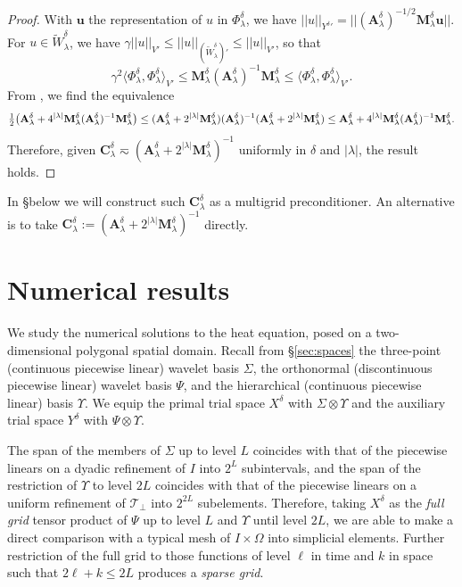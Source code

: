 \documentclass[11pt,a4paper,oneside,english]{amsart}
\numberwithin{equation}{section}
\numberwithin{theorem}{section}
\theoremstyle{definition}
\newcommand{\la}{\langle}
\newcommand{\ra}{\rangle}
\newcommand{\T}{\mathcal{T}}
\newcommand{\jw}[1]{{\color{red}{JW: #1}}}
\begin{document}
\begin{proof}

  With $\mathbf u$ the representation of $u$ in $\Phi_\lambda^\delta$, we have
  $||u||_{{Y^\delta}'} = ||(\mathbf A_\lambda^\delta)^{-1/2} \mathbf M_\lambda^\delta \mathbf u||$.
For $u \in \tilde W_\lambda^\delta$, we have $\gamma ||u||_{V'} \leq ||u||_{(\tilde W_\lambda^\delta)'} \leq ||u||_{V'}$, so that
  \[
    \gamma^2 \la \Phi_\lambda^\delta, \Phi_\lambda^\delta \ra_{V'} \leq \mathbf M_\lambda^\delta (\mathbf A_\lambda^\delta)^{-1} \mathbf M_\lambda^\delta \leq \la \Phi_\lambda^\delta, \Phi_\lambda^\delta \ra_{V'}.
  \]
  From \cite[Thm.~4]{Pearson2012}, we find the equivalence
  \[
\tfrac12\big( {\bf A}_\lambda^\delta + 4^{|\lambda|} {\bf M}^\delta_\lambda ({\bf A}^\delta_\lambda)^{-1}  {\bf M}^\delta_\lambda\big)
\leq ({\bf A}_\lambda^\delta + 2^{|\lambda|}{\bf M}^\delta_\lambda) ({\bf A}_\lambda^\delta)^{-1} ({\bf A}_\lambda^\delta + 2^{|\lambda|}{\bf M}^\delta_\lambda)
\leq {\bf A}_\lambda^\delta + 4^{|\lambda|} {\bf M}^\delta_\lambda ({\bf A}^\delta_\lambda)^{-1}  {\bf M}^\delta_\lambda.
\]
Therefore, given $\mathbf C_\lambda^\delta \eqsim (\mathbf A_\lambda^\delta + 2^{|\lambda|} \mathbf M_\lambda^\delta)^{-1}$ uniformly in $\delta$ and $|\lambda|$, the result holds.
\end{proof}
In \S below we will construct such $\mathbf C_\lambda^\delta$ as a multigrid preconditioner. An alternative is to take $\mathbf C_\lambda^\delta := (\mathbf A_\lambda^\delta + 2^{|\lambda|} \mathbf M_\lambda^\delta)^{-1}$ directly.




\section{Numerical results}
We study the numerical solutions to the heat equation, posed on a two-dimensional
polygonal spatial domain. Recall from \S\ref{sec:spaces} the three-point (continuous piecewise linear) 
wavelet basis $\Sigma$, the orthonormal (discontinuous piecewise linear)
wavelet basis $\Psi$, and the hierarchical (continuous piecewise linear) basis $\Upsilon$.
We equip the primal trial space $X^\delta$ with
$\Sigma \otimes \Upsilon$ and the auxiliary trial space $Y^\delta$ with $\Psi \otimes \Upsilon$.

The span of the members of $\Sigma$ up to level $L$ coincides with that of the
piecewise linears on a dyadic refinement of $I$ into $2^L$ subintervals, and the
span of the restriction of $\Upsilon$ to level $2L$ coincides with that of the
piecewise linears on a uniform refinement of $\T_\perp$ into $2^{2L}$ subelements.
Therefore, taking $X^\delta$ as the \emph{full grid} tensor product of $\Psi$ up to
level $L$ and $\Upsilon$ until level $2L$, we are able to make a direct comparison
with a typical mesh of $I \times \Omega$ into simplicial elements. \jw{meh slecht geformuleerd}
Further restriction of the full grid to those functions of level $\ell$ in time and
$k$ in space such that $2 \ell + k \leq 2L$ produces a \emph{sparse grid}.
\end{document}
